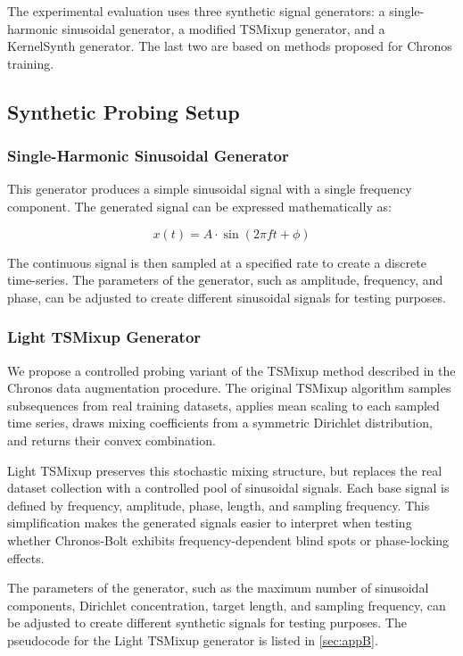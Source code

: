 

The experimental evaluation uses three synthetic signal generators: a single-harmonic sinusoidal generator, a modified TSMixup generator, and a KernelSynth generator. The last two are based on methods proposed for Chronos training.\cite{ansariChronosLearningLanguage2024}

\subsection{Synthetic Probing Setup}

\subsubsection{Single-Harmonic Sinusoidal Generator}
This generator produces a simple sinusoidal signal with a single frequency component. The generated signal can be expressed mathematically as:

\begin{equation}
    x(t) = A \cdot \sin(2\pi f t + \phi)
\end{equation}

The continuous signal is then sampled at a specified rate to create a discrete time-series. The parameters of the generator, such as amplitude, frequency, and phase, can be adjusted to create different sinusoidal signals for testing purposes.

\subsubsection{Light TSMixup Generator}
We propose a controlled probing variant of the TSMixup method described in the Chronos data augmentation procedure.\cite{ansariChronosLearningLanguage2024} The original TSMixup algorithm samples subsequences from real training datasets, applies mean scaling to each sampled time series, draws mixing coefficients from a symmetric Dirichlet distribution, and returns their convex combination.

Light TSMixup preserves this stochastic mixing structure, but replaces the real dataset collection with a controlled pool of sinusoidal signals. Each base signal is defined by frequency, amplitude, phase, length, and sampling frequency. This simplification makes the generated signals easier to interpret when testing whether Chronos-Bolt exhibits frequency-dependent blind spots or phase-locking effects.

The parameters of the generator, such as the maximum number of sinusoidal components, Dirichlet concentration, target length, and sampling frequency, can be adjusted to create different synthetic signals for testing purposes. The pseudocode for the Light TSMixup generator is listed in \autoref{sec:appB}.


